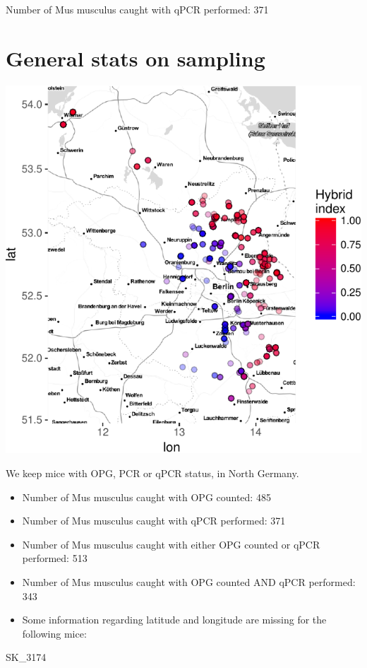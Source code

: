 \documentclass[]{article}
\begin{document}
Number of Mus musculus caught with qPCR performed: 371

\section{General stats on sampling}\label{general-stats-on-sampling}

\includegraphics{Data_Analysis_Alice_files/figure-latex/generalstats-1.pdf}

We keep mice with OPG, PCR or qPCR status, in North Germany.

\begin{itemize}
\item
  Number of Mus musculus caught with OPG counted: 485
\item
  Number of Mus musculus caught with qPCR performed: 371
\item
  Number of Mus musculus caught with either OPG counted or qPCR
  performed: 513
\item
  Number of Mus musculus caught with OPG counted AND qPCR performed: 343
\item
  Some information regarding latitude and longitude are missing for the
  following mice:
\end{itemize}

SK\_3174
\end{document}
